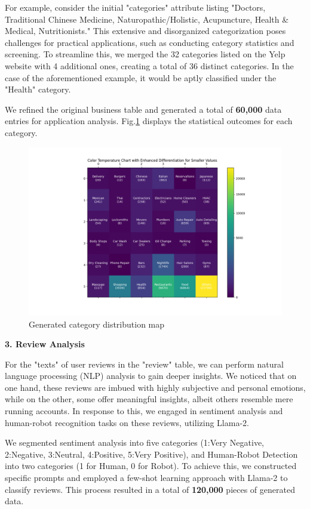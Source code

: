 \documentclass[runningheads]{llncs}
\begin{document}
For example, consider the initial "categories" attribute listing "Doctors, Traditional Chinese Medicine, Naturopathic/Holistic, Acupuncture, Health \& Medical, Nutritionists." This extensive and disorganized categorization poses challenges for practical applications, such as conducting category statistics and screening. To streamline this, we merged the 32 categories listed on the Yelp website with 4 additional ones, creating a total of 36 distinct categories. In the case of the aforementioned example, it would be aptly classified under the "Health" category.

We refined the original business table and generated a total of \textbf{60,000} data entries for application analysis. Fig.\ref{fig:category} displays the statistical outcomes for each category.

\begin{figure}
    \centering
    \includegraphics[width=1\linewidth]{figs/color_chart_categories.png}
    \caption{Generated category distribution map}
    \label{fig:category}
\end{figure}


\textbf{3. Review Analysis}

For the "texts" of user reviews in the "review" table, we can perform natural language processing (NLP) analysis to gain deeper insights. We noticed that on one hand, these reviews are imbued with highly subjective and personal emotions, while on the other, some offer meaningful insights, albeit others resemble mere running accounts. In response to this, we engaged in sentiment analysis and human-robot recognition tasks on these reviews, utilizing Llama-2.

We segmented sentiment analysis into five categories (1:Very Negative, 2:Negative, 3:Neutral, 4:Positive, 5:Very Positive), and Human-Robot Detection into two categories (1 for Human, 0 for Robot). To achieve this, we constructed specific prompts and employed a few-shot learning approach with Llama-2 to classify reviews. This process resulted in a total of \textbf{120,000} pieces of generated data.
\end{document}
